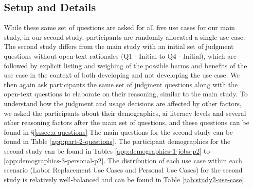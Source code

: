\subsection{Setup and Details}\label{sssec:a-details}
While these same set of questions are asked for all five use cases for our main study, in our second study, participants are randomly allocated a single use case. The second study differs from the main study with an initial set of judgment questions without open-text rationales (Q1 - Initial to Q4 - Initial), which are followed by explicit listing and weighing of the possible harms and benefits of the use case in the context of both developing and not developing the use case. We then again ask participants the same set of judgment questions along with the open-text questions to elaborate on their reasoning, similar to the main study. To understand how the judgment and usage decisions are affected by other factors, we asked the participants about their demographics, ai literacy levels and several other reasoning factors after the main set of questions, and these questions can be found in \S\ref{sssec:a-questions} The main questions for the second study can be found in Table \ref{app:part-2-questions}. The participant demographics for the second study can be found in Tables \ref{app:demographics-1-jobs-p2} to \ref{app:demographics-3-personal-p2}. The distribution of each use case within each scenario (Labor Replacement Use Cases and Personal Use Cases) for the second study is relatively well-balanced and can be found in Table \ref{tab:study2-use-case}.











